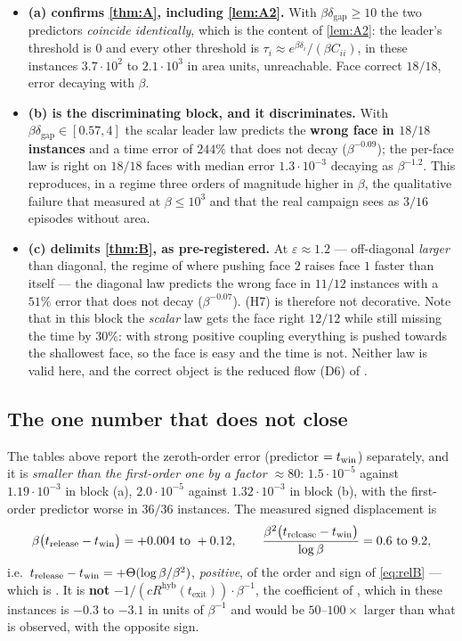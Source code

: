 \documentclass[11pt]{article}
\theoremstyle{remark}
\newcommand{\texit}{t_{\mathrm{exit}}}
\newcommand{\hyb}{\mathrm{hyb}}
\newcommand{\dgap}{\delta_{\mathrm{gap}}}
\newcommand{\hyplabel}[1]{\textup{(#1)}}
\begin{document}
\begin{itemize}
\item \textbf{(a) confirms \cref{thm:A}, including \cref{lem:A2}.} With
$\beta\dgap\ge10$ the two predictors \emph{coincide identically}, which is the
content of \cref{lem:A2}: the leader's threshold is $0$ and every other
threshold is $\tau_i\approx e^{\beta\delta_i}/(\beta C_{ii})$, in these
instances $3.7\cdot10^2$ to $2.1\cdot10^3$ in area units, unreachable. Face
correct $18/18$, error decaying with $\beta$.
\item \textbf{(b) is the discriminating block, and it discriminates.} With
$\beta\dgap\in[0.57,4]$ the scalar leader law predicts the \textbf{wrong face in
$18/18$ instances} and a time error of $244\%$ that does not decay
($\beta^{-0.09}$); the per-face law is right on $18/18$ faces with median error
$1.3\cdot10^{-3}$ decaying as $\beta^{-1.2}$. This reproduces, in a regime three
orders of magnitude higher in $\beta$, the qualitative failure that
\cite[\S4.1]{scoping} measured at $\beta\le10^3$ and that the real campaign sees
as $3/16$ episodes without area.
\item \textbf{(c) delimits \cref{thm:B}, as pre-registered.} At
$\varepsilon\approx1.2$ --- off-diagonal \emph{larger} than diagonal, the regime
of \cite[\S4.2]{scoping} where pushing face $2$ raises face $1$ faster than
itself --- the diagonal law predicts the wrong face in $11/12$ instances with a
$51\%$ error that does not decay ($\beta^{-0.07}$). \hyplabel{H7} is therefore
not decorative. Note that in this block the \emph{scalar} law gets the face
right $12/12$ while still missing the time by $30\%$: with strong positive
coupling everything is pushed towards the shallowest face, so the face is easy
and the time is not. Neither law is valid here, and the correct object is the
reduced flow (D6) of \cite{scoping}.
\end{itemize}

\subsection{The one number that does not close}\label{sec:naoFecha}

The tables above report the zeroth-order error (predictor $=t_{\rm win}$)
separately, and it is \emph{smaller than the first-order one by a factor
$\approx80$}: $1.5\cdot10^{-5}$ against $1.19\cdot10^{-3}$ in block (a),
$2.0\cdot10^{-5}$ against $1.32\cdot10^{-3}$ in block (b), with the first-order
predictor worse in $36/36$ instances. The measured signed displacement is
\[
\beta\bigl(t_{\rm release}-t_{\rm win}\bigr)=+0.004\ \text{to}\ +0.12,
\qquad
\frac{\beta^2\bigl(t_{\rm release}-t_{\rm win}\bigr)}{\log\beta}=0.6\ \text{to}\ 9.2,
\]
i.e.\ $t_{\rm release}-t_{\rm win}=+\Theta(\log\beta/\beta^2)$, \emph{positive},
of the order and sign of \eqref{eq:relB} --- which is \cite[L4$'$(ii)]{paper}.
It is \textbf{not} $-1/(cR^{\hyb}(\texit))\cdot\beta^{-1}$, the coefficient of
\cite[Thm.~6(ii)]{paper}, which in these instances is $-0.3$ to $-3.1$ in units
of $\beta^{-1}$ and would be $50$--$100\times$ larger than what is observed, with
the opposite sign.
\end{document}
